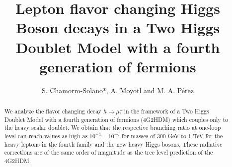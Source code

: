 \documentclass[a4paper]{jpconf}
\begin{document}
\setcounter{page}{1}
\pagestyle{plain}
\title{Lepton flavor changing Higgs Boson decays in a Two Higgs Doublet Model with a fourth generation of fermions}
\author{S. Chamorro-Solano*, A. Moyotl and M. A. P\'erez}

\address{*Departamento de Ciencias Naturales y Exactas, Universidad de la Costa, Calle 58 num. 55-66, Barranquilla, Colombia.}
\address{Departamento de F\'isica, Centro de Investigaci\'on y de Estudios Avanzados del Instituto Polit\'ecnico Nacional, Apdo.  Postal 14-740, 07000 M\'exico D.F., M\'exico.}


\begin{abstract}
 We analyze the flavor changing decay $h\rightarrow \mu \tau  $ in the framework of a Two Higgs Doublet Model with a fourth generation of fermions (4G2HDM)  which couples only to the heavy scalar doublet. We obtain that the respective branching ratio at one-loop level can reach values as high as $ 10^{-4}-10^{-6} $ for masses of $ 300 $ GeV to $ 1 $ TeV for the heavy leptons in the fourth family  and the new
heavy Higgs bosons. These radiative corrections are of the same order of magnitude as the tree level prediction of the 4G2HDM.
\end{abstract}
\end{document}
